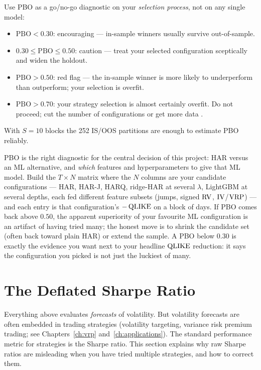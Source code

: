 \begin{keyidea}
Use PBO as a go/no-go diagnostic on your \emph{selection process}, not on any single model:
\begin{itemize}[nosep]
  \item $\text{PBO} < 0.30$: encouraging --- in-sample winners usually survive out-of-sample.
  \item $0.30 \le \text{PBO} \le 0.50$: caution --- treat your selected configuration sceptically and widen the holdout.
  \item $\text{PBO} > 0.50$: red flag --- the in-sample winner is more likely to underperform than outperform; your selection is overfit.
  \item $\text{PBO} > 0.70$: your strategy selection is almost certainly overfit. Do not proceed; cut the number of configurations or get more data \citep{Bailey2014PBO}.
\end{itemize}
With $S = 10$ blocks the 252 IS/OOS partitions are enough to estimate PBO reliably.
\end{keyidea}

\begin{projectconnection}
PBO is the right diagnostic for the central decision of this project: HAR versus an ML alternative, and \emph{which} features and hyperparameters to give that ML model.
Build the $T \times N$ matrix where the $N$ columns are your candidate configurations --- HAR, HAR-J, HARQ, ridge-HAR at several $\lambda$, LightGBM at several depths, each fed different feature subsets (jumps, signed $\operatorname{RV}$, $\operatorname{IV}$/$\operatorname{VRP}$) --- and each entry is that configuration's $-\operatorname{QLIKE}$ on a block of days.
If PBO comes back above $0.50$, the apparent superiority of your favourite ML configuration is an artifact of having tried many; the honest move is to shrink the candidate set (often back toward plain HAR) or extend the sample.
A PBO below $0.30$ is exactly the evidence you want next to your headline $\operatorname{QLIKE}$ reduction: it says the configuration you picked is not just the luckiest of many.
\end{projectconnection}

\section{The Deflated Sharpe Ratio}
\label{sec:eval-dsr}

Everything above evaluates \emph{forecasts} of volatility.
But volatility forecasts are often embedded in trading strategies (volatility targeting, variance risk premium trading; see Chapters~\ref{ch:vrp} and~\ref{ch:applications}).
The standard performance metric for strategies is the Sharpe ratio.
This section explains why raw Sharpe ratios are misleading when you have tried multiple strategies, and how to correct them.

